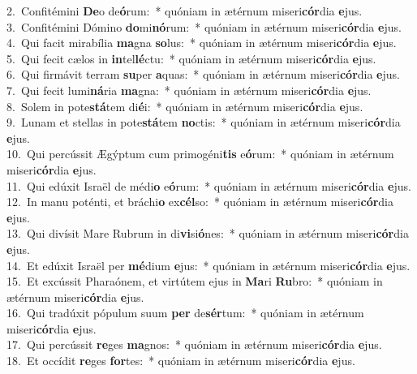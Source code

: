 {2.~}Confitémini \textbf{De}o de\textbf{ó}rum:~* quóniam in ætérnum miseri\textbf{cór}dia \textbf{e}jus.\\
{3.~}Confitémini Dómino \textbf{do}mi\textbf{nó}rum:~* quóniam in ætérnum miseri\textbf{cór}dia \textbf{e}jus.\\
{4.~}Qui facit mirabília \textbf{ma}gna \textbf{so}lus:~* quóniam in ætérnum miseri\textbf{cór}dia \textbf{e}jus.\\
{5.~}Qui fecit cælos in \textbf{in}tel\textbf{lé}ctu:~* quóniam in ætérnum miseri\textbf{cór}dia \textbf{e}jus.\\
{6.~}Qui firmávit terram \textbf{su}per \textbf{a}quas:~* quóniam in ætérnum miseri\textbf{cór}dia \textbf{e}jus.\\
{7.~}Qui fecit lumi\textbf{ná}ria \textbf{ma}gna:~* quóniam in ætérnum miseri\textbf{cór}dia \textbf{e}jus.\\
{8.~}Solem in pote\textbf{stá}tem di\textbf{é}i:~* quóniam in ætérnum miseri\textbf{cór}dia \textbf{e}jus.\\
{9.~}Lunam et stellas in pote\textbf{stá}tem \textbf{no}ctis:~* quóniam in ætérnum miseri\textbf{cór}dia \textbf{e}jus.\\
{10.~}Qui percússit Ægýptum cum primogéni\textbf{tis} e\textbf{ó}rum:~* quóniam in ætérnum miseri\textbf{cór}dia \textbf{e}jus.\\
{11.~}Qui edúxit Israël de médi\textbf{o} e\textbf{ó}rum:~* quóniam in ætérnum miseri\textbf{cór}dia \textbf{e}jus.\\
{12.~}In manu poténti, et bráchi\textbf{o} ex\textbf{cél}so:~* quóniam in ætérnum miseri\textbf{cór}dia \textbf{e}jus.\\
{13.~}Qui divísit Mare Rubrum in di\textbf{vi}si\textbf{ó}nes:~* quóniam in ætérnum miseri\textbf{cór}dia \textbf{e}jus.\\
{14.~}Et edúxit Israël per \textbf{mé}dium \textbf{e}jus:~* quóniam in ætérnum miseri\textbf{cór}dia \textbf{e}jus.\\
{15.~}Et excússit Pharaónem, et virtútem ejus in \textbf{Ma}ri \textbf{Ru}bro:~* quóniam in ætérnum miseri\textbf{cór}dia \textbf{e}jus.\\
{16.~}Qui tradúxit pópulum suum \textbf{per} de\textbf{sér}tum:~* quóniam in ætérnum miseri\textbf{cór}dia \textbf{e}jus.\\
{17.~}Qui percússit \textbf{re}ges \textbf{ma}gnos:~* quóniam in ætérnum miseri\textbf{cór}dia \textbf{e}jus.\\
{18.~}Et occídit \textbf{re}ges \textbf{for}tes:~* quóniam in ætérnum miseri\textbf{cór}dia \textbf{e}jus.\\
